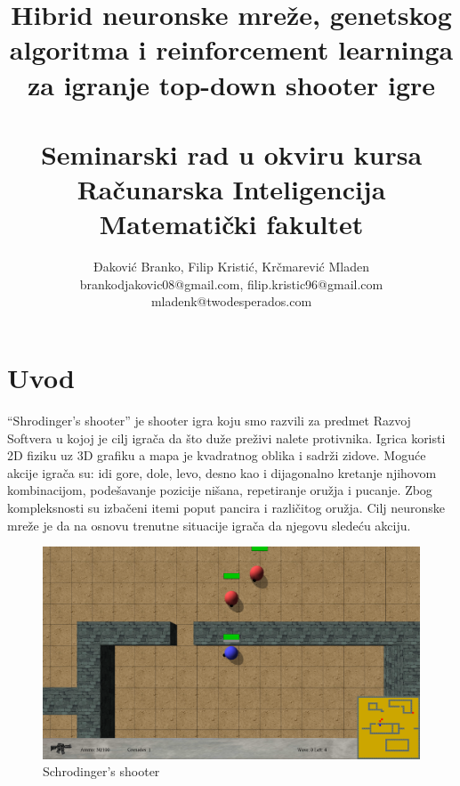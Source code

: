 \documentclass[a4paper]{article}
\begin{document}
\title{Hibrid neuronske mreže, genetskog algoritma i reinforcement learninga za igranje top-down shooter igre\\~\\ \small{Seminarski rad u okviru kursa\\Računarska Inteligencija\\ Matematički fakultet}}
\author{Đaković Branko, Filip Kristić, Krčmarević Mladen\\brankodjakovic08@gmail.com, filip.kristic96@gmail.com\\ mladenk@twodesperados.com}

\maketitle

\tableofcontents

\newpage

\section{Uvod}
\label{sec:uvod}
\par “Shrodinger's shooter” je shooter igra koju smo razvili za predmet Razvoj Softvera u kojoj je cilj igrača da što duže preživi nalete protivnika. Igrica koristi 2D fiziku uz 3D grafiku a mapa je kvadratnog oblika i sadrži zidove. Moguće akcije igrača su: idi gore, dole, levo, desno kao i dijagonalno kretanje njihovom kombinacijom, podešavanje pozicije nišana, repetiranje oružja i pucanje. Zbog kompleksnosti su izbačeni itemi poput pancira i različitog oružja. Cilj neuronske mreže\cite{neural} je da na osnovu trenutne situacije igrača da njegovu sledeću akciju. 
\begin{figure}[h!]
	\begin{center}
		\includegraphics[scale=0.18]{igra.png}
	\end{center}
	\caption{Schrodinger's shooter}
	\label{fig:igra}
\end{figure}
  
\end{document}
